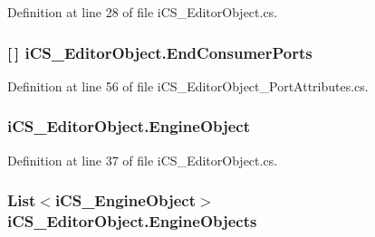 Definition at line 28 of file i\+C\+S\+\_\+\+Editor\+Object.\+cs.

\hypertarget{classi_c_s___editor_object_a1f197169f9b56067de530368b0b8c25f}{
\subsubsection[{End\+Consumer\+Ports}]{ \mbox{[}$\,$\mbox{]} i\+C\+S\+\_\+\+Editor\+Object.\+End\+Consumer\+Ports\hspace{0.3cm}{\ttfamily [get]}}}\label{classi_c_s___editor_object_a1f197169f9b56067de530368b0b8c25f}


Definition at line 56 of file i\+C\+S\+\_\+\+Editor\+Object\+\_\+\+Port\+Attributes.\+cs.

\hypertarget{classi_c_s___editor_object_abb22fd4696d50a2a55726bf825241c90}{
\subsubsection[{Engine\+Object}]{ i\+C\+S\+\_\+\+Editor\+Object.\+Engine\+Object\hspace{0.3cm}{\ttfamily [get]}}}\label{classi_c_s___editor_object_abb22fd4696d50a2a55726bf825241c90}


Definition at line 37 of file i\+C\+S\+\_\+\+Editor\+Object.\+cs.

\hypertarget{classi_c_s___editor_object_a3b690a386bd7f25fbe3197a2df476b9f}{
\subsubsection[{Engine\+Objects}]{\setlength{\rightskip}{0pt plus 5cm}List$<${\bf i\+C\+S\+\_\+\+Engine\+Object}$>$ i\+C\+S\+\_\+\+Editor\+Object.\+Engine\+Objects\hspace{0.3cm}{\ttfamily [get]}}}\label{classi_c_s___editor_object_a3b690a386bd7f25fbe3197a2df476b9f}


